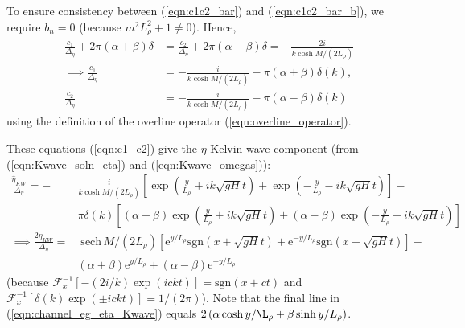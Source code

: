 \documentclass[10pt,reqno]{amsart}
\newcommand{\expe}{{\mathrm e}}
\newcommand{\sign}{\mathrm{sgn}}
\newcommand{\sech}{\mathrm{sech \,}}
\begin{document}
To ensure consistency between (\ref{eqn:c1c2_bar}) and (\ref{eqn:c1c2_bar_b}), we require $b_n = 0$ (because $m^2 L_\rho^2 + 1 \neq 0$).
Hence, 
\begin{align}
\frac{\overline{c}_1}{\Delta_\eta} + 2 \pi \left( \alpha + \beta \right) \delta & = \frac{\overline{c}_2}{\Delta_\eta} + 2 \pi \left( \alpha - \beta \right) \delta  = - \frac{2 i }{k \cosh M/(2 L_\rho)}  \label{eqn:c1_c2} \\
\implies
\frac{c_1}{\Delta_\eta} & = - \frac{i }{k \cosh M/(2 L_\rho)} - \pi \left( \alpha + \beta \right) \delta(k) , \\
\frac{c_2}{\Delta_\eta} & = - \frac{i }{k \cosh M/(2 L_\rho)} -  \pi \left( \alpha - \beta \right) \delta(k) 
\end{align}
using the definition of the overline operator (\ref{eqn:overline_operator}).

These equations (\ref{eqn:c1_c2}) give the $\eta$ Kelvin wave component (from (\ref{eqn:Kwave_soln_eta}) and (\ref{eqn:Kwave_omegas})):
\begin{align}
\frac{\hat{\eta}_{KW}}{\Delta_\eta} = - &\frac{i }{k \cosh M/(2 L_\rho)} \left[ \exp  \left(\frac{y}{L_\rho} + i k \sqrt{g H} t \right) + \exp \left( - \frac{y}{L_\rho} - i k \sqrt{g H} t \right) \right] - \nonumber \\
& \pi \delta(k) \left[
\left( \alpha + \beta \right) \exp  \left(\frac{y}{L_\rho} + i k \sqrt{g H} t \right) + \left( \alpha - \beta \right) \exp \left( - \frac{y}{L_\rho} - i k \sqrt{g H} t \right) 
\right] \\
\implies
\frac{2 \eta_{KW}}{\Delta_\eta} = & \;\sech M/(2 L_\rho) \left[ \expe^{y / L_\rho} \sign \left( x + \sqrt{g H} t \right) + \expe^{-y/  L_\rho} \sign \left( x - \sqrt{g H} t \right) \right] - \nonumber \\
& \left( \alpha + \beta \right) \expe^{y/L_\rho} + \left( \alpha - \beta \right) \expe^{- y/L_\rho} 
\label{eqn:channel_eg_eta_Kwave}
\end{align}
(because ${\mathcal F}_x^{-1} \left[ - (2 i / k) \exp \left( i c k t \right) \right] = \sign \left( x + c t \right)$ and ${\mathcal F}_x^{-1} \left[ \delta(k) \exp \left( \pm i c k t \right) \right] = 1/(2 \pi)$).
Note that the final line in (\ref{eqn:channel_eg_eta_Kwave}) equals $2 \left( \alpha \cosh y/ \L_\rho + \beta \sinh y / L_\rho \right)$.
\end{document}
